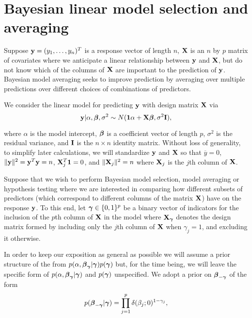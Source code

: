 \section{Bayesian linear model selection and averaging}
\label{sec:bma}



Suppose ${\bf y} = (y_1,\ldots,y_n)^T$ is a response vector of length $n$, ${\bf X}$ is an $n$ by $p$ matrix 
of covariates where we anticipate a linear relationship between ${\bf y}$ and ${\bf X}$, but do not know
which of the columns of ${\bf X}$ are important to the prediction of ${\bf y}$.
Bayesian model averaging seeks to improve prediction by averaging over multiple
predictions over different choices of combinations of predictors.

We consider the linear model for predicting ${\bf y}$ with design matrix ${\bf X}$ via
\begin{equation}
	\label{eq:linearModel}
	{\bf y} | \alpha, {\boldsymbol \beta}, \sigma^2 \sim N({\bf 1}\alpha + {\bf X} {\boldsymbol \beta}, \sigma^2 {\bf I}),
\end{equation} 


\noindent where $\alpha$ is the model intercept, ${\boldsymbol \beta}$ is a coefficient vector of length $p$, 
$\sigma^2$ is the residual variance, and ${\bf I}$ is the $n \times n$ identity matrix. 
Without loss of generality, to simplify later calculations, we will standardize ${\bf y}$ and ${\bf X}$ 
so that $\overline{y} = 0$, 
$\|{\bf y}\|^2 = {\bf y}^T{\bf y} = n$, ${\bf X}_j^T{\bf 1} = 0$,  and $\|{\bf X}_j\|^2 = n$ where ${\bf X}_j$ is the $j$th 
column of ${\bf X}$. 


Suppose that we wish to perform Bayesian model selection, model averaging or hypothesis 
testing where we are interested in comparing how different subsets of predictors 
(which correspond to different columns of the matrix ${\bf X}$) have on the response ${\bf y}$. To this end, 
let ${\boldsymbol \gamma} \in \{0, 1\}^p$ be a binary vector of indicators for the inclusion of the $p$th column 
of ${\bf X}$ in the model where ${\bf X}_{\boldsymbol \gamma}$ denotes the design matrix formed by including only the 
$j$th column of ${\bf X}$ when $\gamma_j = 1$, and excluding it otherwise. 

In order to keep our exposition as general as possible we will assume a prior structure of
the from 
$p(\alpha,{\boldsymbol \beta}_{{\boldsymbol \gamma}}|{\boldsymbol \gamma})p({\boldsymbol \gamma})$ but,
for
the time being, we will leave the specific form of $p(\alpha,{\boldsymbol \beta}_{{\boldsymbol \gamma}}|{\boldsymbol \gamma})$ and $p({\boldsymbol \gamma})$ unspecified. 
We adopt a prior on ${\boldsymbol \beta}_{-{\boldsymbol \gamma}}$  
of the form
\begin{equation}
	\label{eq:spikeAndSlab}
	\displaystyle p({\boldsymbol \beta}_{-{\boldsymbol \gamma}}|{\boldsymbol \gamma}) = \prod_{j=1}^p \delta(\beta_j;0)^{1-\gamma_j},
\end{equation} 

